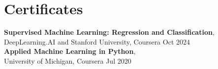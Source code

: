 \documentclass[a4paper,10pt]{article}
\newcommand{\resumeItem}[1]{\item #1}
\newcommand{\resumeSubheading}[4]{
    \textbf{#1} \hfill #2 \\
    \textit{#3} \hfill \textit{#4}
}
\begin{document}








\section*{Certificates}

\textbf{Supervised Machine Learning: Regression and Classification},\\
DeepLearning.AI and Stanford University, Coursera 
\hfill Oct 2024 \\
\textbf{Applied Machine Learning in Python},\\
University of Michigan, Coursera 
\hfill Jul 2020
\end{document}
